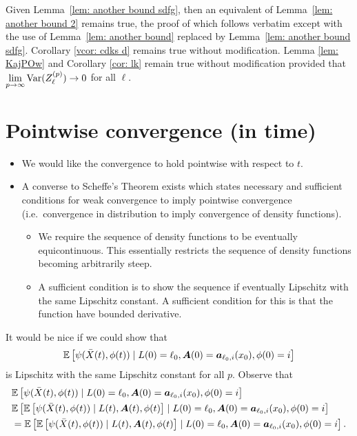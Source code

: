 Given Lemma~\ref{lem: another bound sdfg}, then an equivalent of Lemma~\ref{lem: another bound 2} remains true, the proof of which follows verbatim except with the use of Lemma~\ref{lem: another bound} replaced by Lemma~\ref{lem: another bound sdfg}. Corollary \ref{vcor: cdks d} remains true without modification. Lemma \ref{lem: KajPOw} and Corollary \ref{cor: lk} remain true without modification provided that \(\lim\limits_{p\to\infty}\mathrm{Var}(Z_\ell^{(p)})\to 0\) for all \(\ell\). 

\section{Pointwise convergence (in time)}
\begin{itemize}
	\item We would like the convergence to hold pointwise with respect to \(t\). 
	\item A converse to Scheffe's Theorem exists which states necessary and sufficient conditions for weak convergence to imply pointwise convergence (i.e.~convergence in distribution to imply convergence of density functions). 
	\begin{itemize}
		\item We require the sequence of density functions to be eventually equicontinuous. This essentially restricts the sequence of density functions becoming arbitrarily steep. 
		\item A sufficient condition is to show the sequence if eventually Lipschitz with the same Lipschitz constant. A sufficient condition for this is that the function have bounded derivative. 
	\end{itemize}
\end{itemize}
It would be nice if we could show that 
\[\mathbb E\left[\psi(\bar X(t),\phi(t))  \mid L(0)=\ell_0, \boldsymbol A(0)=\boldsymbol  a_{\ell_0,i}(x_0), \phi(0)=i \right]\]
is Lipschitz with the same Lipschitz constant for all \(p\). Observe that 
\begin{align}
	&\mathbb E\left[\psi(\bar X(t),\phi(t))  \mid L(0)=\ell_0, \boldsymbol A(0)=\boldsymbol  a_{\ell_0,i}(x_0), \phi(0)=i \right]
	\\&\mathbb E\left[ \mathbb E\left[\psi(\bar X(t),\phi(t))  \mid L(t), \boldsymbol A(t), \phi(t) \right] \mid L(0)=\ell_0, \boldsymbol A(0)=\boldsymbol  a_{\ell_0,i}(x_0), \phi(0)=i \right]
	\\&=\mathbb E\left[ \mathbb E\left[\psi(\bar X(t),\phi(t))  \mid L(t), \boldsymbol A(t), \phi(t) \right] \mid L(0)=\ell_0, \boldsymbol A(0)=\boldsymbol  a_{\ell_0,i}(x_0), \phi(0)=i \right].
\end{align}
